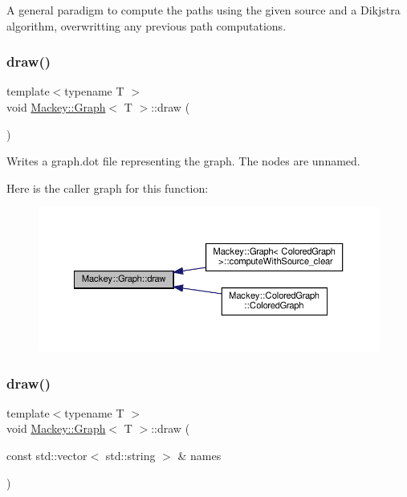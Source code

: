A general paradigm to compute the paths using the given source and a Dikjstra algorithm, overwritting any previous path computations. 

\mbox{\label{classMackey_1_1Graph_ab88d38f2fa1822d415ce7dac272b32dc}} 
\subsubsection{\texorpdfstring{draw()}{draw()}\hspace{0.1cm}{\footnotesize\ttfamily [1/2]}}
{\footnotesize\ttfamily template$<$typename T $>$ \\
void \hyperlink{classMackey_1_1Graph}{Mackey\+::\+Graph}$<$ T $>$\+::draw (\begin{DoxyParamCaption}{ }\end{DoxyParamCaption})}



Writes a graph.\+dot file representing the graph. The nodes are unnamed. 

Here is the caller graph for this function\+:\nopagebreak
\begin{figure}[H]
\begin{center}
\leavevmode
\includegraphics[width=350pt]{classMackey_1_1Graph_ab88d38f2fa1822d415ce7dac272b32dc_icgraph}
\end{center}
\end{figure}
\mbox{\label{classMackey_1_1Graph_a63aa485ca7838f3dc66da1749e09cd84}} 
\subsubsection{\texorpdfstring{draw()}{draw()}\hspace{0.1cm}{\footnotesize\ttfamily [2/2]}}
{\footnotesize\ttfamily template$<$typename T $>$ \\
void \hyperlink{classMackey_1_1Graph}{Mackey\+::\+Graph}$<$ T $>$\+::draw (\begin{DoxyParamCaption}\item[{const std\+::vector$<$ std\+::string $>$ \&}]{names }\end{DoxyParamCaption})}



